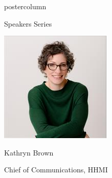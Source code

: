 \documentclass{beamer}
\begin{document}
\begin{frame}
\begin{columns}
\begin{column}{.33\textwidth}
\begin{beamercolorbox}[center,wd=\textwidth]{postercolumn}
\begin{minipage}[T]{.95\textwidth}
{\begin{myblock}{Speakers Series}
\begin{addmargin}[1em]{1em}
\begin{minipage}{0.4\linewidth}
                    \includegraphics[width=\linewidth]{img/kathryn.jpg}
                    \centerline{Kathryn Brown}\newline
                    \centerline{Chief of Communications, HHMI}
                \end{minipage}
            \end{addmargin}
            \vspace{1cm}
            \begin{addmargin}[1em]{1em}
                \centering
                \begin{minipage}{0.4\linewidth}

\end{minipage}
\end{addmargin}
\end{myblock}}
\end{minipage}
\end{beamercolorbox}
\end{column}
\end{columns}
\end{frame}
\end{document}
